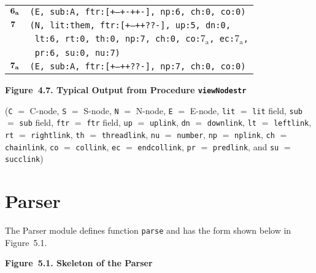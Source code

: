\documentclass{article}
\begin{document}
\begin{minipage}{\textwidth}
{\begin{tabular}{|r|l|}
    ${\textbf{\textrm{6}}_{\textbf{\textrm{a}}}}$ & \texttt{\texttt{(E,~sub:A,~ftr:[+--+-++-],~np:6,~ch:0,~co:0)}} \\
    ${\textbf{\textrm{7}}_{\phantom{z}}}$ & \texttt{\texttt{(N,~lit:them,~ftr:[+--++??-],~up:5,~dn:0,}} \\
    & \texttt{\texttt{~lt:6,~rt:0,~th:0,~np:7,~ch:0,~co:${\textrm{7}_{\textrm{a}}}$,~ec:${\textrm{7}_{\textrm{a}}}$,}} \\
    & \texttt{\texttt{~pr:6,~su:0,~nu:7)}} \\
    ${\textbf{\textrm{7}}_{\textbf{\textrm{a}}}}$ & \texttt{\texttt{(E,~sub:A,~ftr:[+--++??-],~np:7,~ch:0,~co:0)}} \\
    \hline
  \end{tabular}
  }
\bigbreak
\textbf{Figure~4.7. Typical Output from Procedure \texttt{viewNodestr}}
\end{minipage}
\bigbreak
\noindent(\texttt{C} ${=}$ C-node, \texttt{S} ${=}$ S-node, \texttt{N}
${=}$ N-node, \texttt{E} ${=}$ E-node, \texttt{lit} ${=}$
\texttt{lit} field, \texttt{sub} ${=}$ \texttt{sub} field,
\texttt{ftr} ${=}$ \texttt{ftr} field, \texttt{up} ${=}$
\texttt{uplink}, \texttt{dn} ${=}$ \texttt{downlink},
\texttt{lt} ${=}$ \texttt{leftlink}, \texttt{rt} ${=}$
\texttt{rightlink}, \texttt{th} ${=}$ \texttt{threadlink},
\texttt{nu} ${=}$ \texttt{number}, \texttt{np} ${=}$
\texttt{nplink}, \texttt{ch} ${=}$ \texttt{chainlink},
\texttt{co} ${=}$ \texttt{collink}, \texttt{ec} ${=}$
\texttt{endcollink}, \texttt{pr} ${=}$ \texttt{predlink}, and
\texttt{su} ${=}$ \texttt{succlink})

%
%

\section{Parser}

The Parser module defines function \texttt{parse} and has the
form shown below in Figure~5.1.

\bigbreak
\begin{minipage}{\textwidth}
\vbox{}
\bigbreak
{}
\textbf{Figure~5.1. Skeleton of the Parser}
\end{minipage}
\bigbreak
\end{document}
